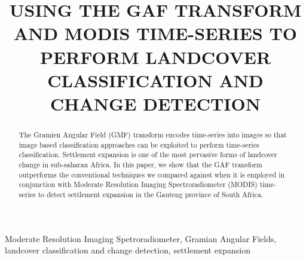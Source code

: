 \documentclass{article}
\title{USING THE GAF TRANSFORM AND MODIS TIME-SERIES TO PERFORM LANDCOVER CLASSIFICATION AND CHANGE DETECTION}
\begin{document}
%
\maketitle
%
\begin{abstract}
The Gramien Angular Field (GMF) transform encodes time-series into images so that image based classification approaches can be exploited to perform time-series classification. Settlement expansion is one of the most pervasive forms of landcover change in sub-saharan Africa. In this paper, we show that the GAF transform outperforms the conventional techniques we compared against when it is employed in conjunction with Moderate Resolution Imaging Spectroradiometer (MODIS) time-series to detect settlement expansion in the Gauteng province of South Africa.   
\end{abstract}
%
\begin{keywords}
Moderate Resolution Imaging Spetroradiometer, Gramian Angular Fields, landcover classification and change detection, settlement expansion
\end{keywords}
%
\end{document}
